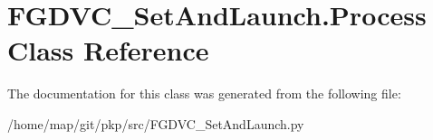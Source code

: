 \hypertarget{classFGDVC__SetAndLaunch_1_1Process}{\section{\-F\-G\-D\-V\-C\-\_\-\-Set\-And\-Launch.\-Process \-Class \-Reference}
\label{classFGDVC__SetAndLaunch_1_1Process}
}


\-The documentation for this class was generated from the following file\-:\begin{DoxyCompactItemize}
\item 
/home/map/git/pkp/src/\-F\-G\-D\-V\-C\-\_\-\-Set\-And\-Launch.\-py\end{DoxyCompactItemize}
